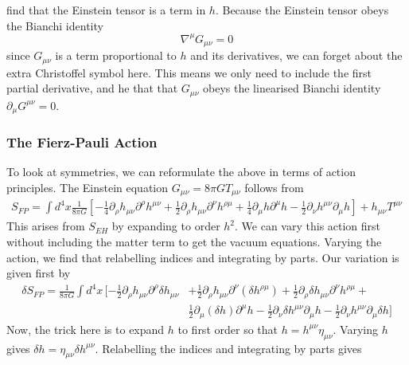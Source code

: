 find that the Einstein tensor is 
a term in $ h $. Because the Einstein tensor obeys the 
Bianchi identity 
\[
 \nabla ^ \mu G _{ \mu \nu } =  0
\] since $ G _{ \mu \nu } $ is a term 
proportional to $ h $ and its derivatives, we can 
forget about the extra Christoffel symbol here. 
This means we only need to include the first partial derivative, 
and he that that $ G _{ \mu \nu }$ obeys the linearised Bianchi identity $ \partial  _ \mu G ^{ \mu \nu }  =0  $. 

\subsubsection{The Fierz-Pauli Action}
To look at symmetries, we can reformulate 
the above in terms of action principles. 
The Einstein equation $ G _{ \mu \nu }  = 8 \pi G T _{ \mu \nu } $ follows from 
\begin{align*}
	S_{ FP  } = \int d ^ 4 x \frac{1}{ 8 \pi G } \left[ 
	 - \frac{1}{4 } \partial  _ \rho h _{ \mu \nu } \partial  ^ \rho h ^{ \mu \nu } + 
 \frac{1}{2 } \partial  _ \rho h _{ \mu \nu } \partial  ^ \nu h ^{ \rho \mu } 
 + \frac{1}{4 } \partial  _ \mu h \partial  ^ \mu h  - \frac{1}{2 } \partial  _ \nu h ^{ \mu \nu } \partial  _ \mu h \right]  
 + h _{ \mu \nu } T ^{ \mu \nu } 
\end{align*}
This arises from $ S _{ EH } $ by expanding to order $ h ^ 2 $. 
We can vary this action first without including the matter 
term to get the vacuum equations. 
Varying the action, we find that relabelling 
indices and integrating by parts. Our variation is given 
first by
\begin{align*}
	\delta S_{FP}  = \frac{1}{ 8 \pi G } \int d ^ 4 x \, 
	[  - \frac{1}{2 } \partial  _ \rho h _{ \mu \nu } 
		\partial  ^ \rho \delta h _{ \mu \nu }  & + \frac{1}{2 } \partial  _ \rho h _{ \mu \nu } \partial  ^ \nu \left( \delta h ^{ \rho \mu }  \right)  
	+   \frac{1}{2 }  \partial  _ \rho \delta h _{ \mu \nu } \partial  ^ \nu h ^{ \rho \mu }+ \\ 
	   & \frac{1}{2 } \partial  _ \mu \left( \delta h  \right)  \partial  ^ \mu h 
 - \frac{1}{2 } \partial  _ \nu \delta h ^{ \mu \nu } \partial  _ \mu h - \frac{1}{2 } \partial  _ \nu h ^{ \mu \nu } \partial  _ \mu \delta h ] 
\end{align*}
Now, the trick here is to expand $ h $ to first order so that 
$ h  = h ^{ \mu \nu } \eta _{ \mu \nu } $.
Varying $ h $ gives $ \delta h  = \eta _{ \mu \nu } \delta h ^{ \mu \nu } $. 
Relabelling the indices and integrating by parts 
gives 
